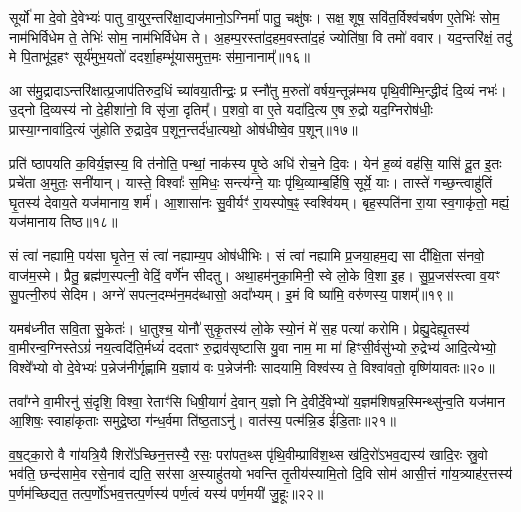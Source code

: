 सूर्यो॑ मा दे॒वो दे॒वेभ्यः॑ पातु वा॒युर॒न्तरि॑क्षा॒द्यज॑मानो॒\-ऽग्निर्मा॑ पातु॒ चक्षु॑षः। सक्ष॒ शूष॒ सवि॑त॒र्विश्व॑चर्\mbox{}षण ए॒तेभिः॑ सोम॒ नाम॑भिर्विधेम ते॒ तेभिः॑ सोम॒ नाम॑भिर्विधेम ते। अ॒हम्प॒रस्ता॑द॒हम॒वस्ता॑द॒हं ज्योति॑षा॒ वि तमो॑ ववार। यद॒न्तरि॑क्षं॒ तदु॑ मे पि॒ताभू॑द॒हꣳ सूर्य॑मुभ॒यतो॑ ददर्\mbox{}शा॒हम्भू॑यासमुत्त॒मः स॑मा॒नानाम्᳚॥१६॥

आ स॑मु॒द्रादा\-ऽन्तरि॑क्षात्प्र॒जाप॑तिरुद॒धिं च्या॑वया॒तीन्द्रः॒ प्र स्नौ॑तु म॒रुतो॑ वर्\mbox{}षय॒न्तून्न॑म्भय पृथि॒वीम्भि॒न्द्धीदं दि॒व्यं नभः॑। उ॒द्नो दि॒व्यस्य॑ नो दे॒हीशा॑नो॒ वि सृ॑जा॒ दृतिम्᳚। प॒शवो॒ वा ए॒ते यदा॑दि॒त्य ए॒ष रु॒द्रो यद॒ग्निरोष॑धीः॒ प्रास्या॒ग्नावा॑दि॒त्यं जु॑होति रु॒द्रादे॒व प॒शून॒न्तर्द॑धा॒त्यथो॒ ओष॑धीष्वे॒व प॒शून्॥१७॥

प्रति॑ ष्ठापयति क॒विर्य॒ज्ञस्य॒ वि त॑नोति॒ पन्थां॒ नाक॑स्य पृ॒ष्ठे अधि॑ रोच॒ने दि॒वः। येन॑ ह॒व्यं वह॑सि॒ यासि॑ दू॒त इ॒तः प्रचे॑ता अ॒मुतः॒ सनी॑यान्। यास्ते॒ विश्वाः᳚ स॒मिधः॒ सन्त्य॑ग्ने॒ याः पृ॑थि॒व्याम्ब॒र्\mbox{}हिषि॒ सूर्ये॒ याः। तास्ते॑ गच्छ॒न्त्वाहु॑तिं घृ॒तस्य॑ देवाय॒ते यज॑मानाय॒ शर्म॑। आ॒शासा॑नः सु॒वीर्यꣳ॑ रा॒यस्पोष॒ꣴ॒ स्वश्वि॑यम्। बृह॒स्पति॑ना रा॒या स्व॒गाकृ॑तो॒ मह्यं॒ यज॑मानाय तिष्ठ॥१८॥

{\anuvakamend[{स॒मा॒नाना॒मोष॑धीष्वे॒व प॒शून्मह्यं॒ यज॑माना॒यैक॑ञ्च॥५॥}]}

सं त्वा॑ नह्यामि॒ पय॑सा घृ॒तेन॒ सं त्वा॑ नह्याम्य॒प ओष॑धीभिः। सं त्वा॑ नह्यामि प्र॒जया॒हम॒द्य सा दी᳚क्षि॒ता स॑नवो॒ वाज॑म॒स्मे। प्रैतु॒ ब्रह्म॑ण॒स्पत्नी॒ वेदिं॒ वर्णे॑न सीदतु। अथा॒हम॑नुका॒मिनी॒ स्वे लो॒के वि॒शा इ॒ह। सु॒प्र॒जस॑स्त्वा व॒यꣳ सु॒पत्नी॒रुप॑ सेदिम। अग्ने॑ सपत्न॒दम्भ॑न॒मद॑ब्धासो॒ अदा᳚भ्यम्। इ॒मं वि ष्या॑मि॒ वरु॑णस्य॒ पाशम्᳚॥१९॥

यमब॑ध्नीत सवि॒ता सु॒केतः॑। धा॒तुश्च॒ योनौ॑ सुकृ॒तस्य॑ लो॒के स्यो॒नं मे॑ स॒ह पत्या॑ करोमि। प्रेह्यु॒देह्यृ॒तस्य॑ वा॒मीरन्व॒ग्निस्ते\-ऽग्रं॑ नय॒त्वदि॑ति॒र्मध्यं॑ ददताꣳ रु॒द्राव॑सृष्टासि यु॒वा नाम॒ मा मा॑ हिꣳसी॒र्वसु॑भ्यो रु॒द्रेभ्य॑ आदि॒त्येभ्यो॒ विश्वे᳚भ्यो वो दे॒वेभ्यः॑ प॒न्नेज॑नीर्गृह्णामि य॒ज्ञाय॑ वः प॒न्नेज॑नीः सादयामि॒ विश्व॑स्य ते॒ विश्वा॑वतो॒ वृष्णि॑यावतः॥२०॥

तवा᳚ग्ने वा॒मीरनु॑ सं॒दृशि॒ विश्वा॒ रेताꣳ॑सि धिषी॒यागं॑ दे॒वान् य॒ज्ञो नि दे॒वीर्दे॒वेभ्यो॑ य॒ज्ञम॑शिषन्न॒स्मिन्थ्सु॑न्व॒ति यज॑मान आ॒शिषः॒ स्वाहा॑कृताः समुद्रे॒ष्ठा ग॑न्ध॒र्वमा ति॑ष्ठ॒ता\-ऽनु॑। वात॑स्य॒ पत्म॑न्नि॒ड ई॑डि॒ताः॥२१॥

{\anuvakamend[{पाशं॒ वृष्णि॑यावतस्त्रि॒ꣳ॒शच्च॑॥६॥}]}

व॒ष॒ट्का॒रो वै गा॑यत्रि॒यै शिरो᳚\-ऽच्छिन॒त्तस्यै॒ रसः॒ परा॑पत॒थ्स पृ॑थि॒वीम्प्रावि॑श॒थ्स ख॑दि॒रो॑\-ऽभव॒द्यस्य॑ खादि॒रः स्रु॒वो भव॑ति॒ छन्द॑सामे॒व रसे॒नाव॑ द्यति॒ सर॑सा अ॒स्याहु॑तयो भवन्ति तृ॒तीय॑स्यामि॒तो दि॒वि सोम॑ आसी॒त्तं गा॑य॒त्र्याह॑र॒त्तस्य॑ प॒र्णम॑च्छिद्यत॒ तत्प॒र्णो॑\-ऽभव॒त्तत्प॒र्णस्य॑ पर्ण॒त्वं यस्य॑ पर्ण॒मयी॑ जु॒हूः॥२२॥

